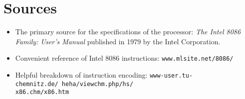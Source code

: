 \newpage
\section{Sources}
    \begin{itemize}
        \item The primary source for the specifications of the processor: \textit{The Intel 8086 Family: User's Manual} published in 1979 by the Intel Corporation.
        \item Convenient reference of Intel 8086 instructions: \texttt{www.mlsite.net/8086/}
        \item Helpful breakdown of instruction encoding: \texttt{www-user.tu-chemnitz.de/~heha/viewchm.php/hs/\\x86.chm/x86.htm}
    \end{itemize}
